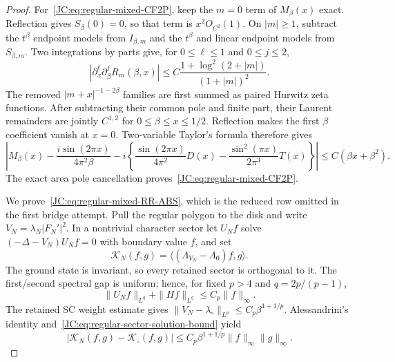 \begin{proof}
For~\eqref{JC:eq:regular-mixed-CF2P}, keep the $m=0$ term of
$M_\beta(x)$ exact.  Reflection gives $S_\beta(0)=0$, so that term is
$x^2O_{C^2}(1)$.  On $|m|\ge1$, subtract the $t^\beta$ endpoint models
from $I_{\beta,m}$ and the $t^\beta$ and linear endpoint models from
$S_{\beta,m}$.  Two integrations by parts give, for
$0\le\ell\le1$ and $0\le j\le2$,
\begin{equation}\label{JC:eq:regular-mixed-joint-remainder}
 |\partial_x^\ell\partial_\beta^jR_m(\beta,x)|
 \le C\frac{1+\log^2(2+|m|)}{(1+|m|)^2}.
\end{equation}
The removed $|m+x|^{-1-2\beta}$ families are first summed as paired
Hurwitz zeta functions.  After subtracting their common pole and finite
part, their Laurent remainders are jointly $C^{1,2}$ for
$0\le\beta\le x\le1/2$.  Reflection makes the first $\beta$ coefficient
vanish at $x=0$.  Two-variable Taylor's formula therefore gives
\[
 \left|M_\beta(x)-\frac{i\sin(2\pi x)}{4\pi^2\beta}
 -i\left\{\frac{\sin(2\pi x)}{4\pi^2}D(x)
 -\frac{\sin^2(\pi x)}{2\pi^3}T(x)\right\}\right|
 \le C(\beta x+\beta^2).
\]
The exact area pole cancellation proves~\eqref{JC:eq:regular-mixed-CF2P}.

We prove~\eqref{JC:eq:regular-mixed-RR-ABS}, which is the reduced row omitted
in the first bridge attempt.  Pull the regular polygon to the disk and
write $V_N=\lambda_N|F_N'|^2$.  In a nontrivial character sector let
$U_Nf$ solve $(-\Delta-V_N)U_Nf=0$ with boundary value $f$, and set
\[
 \mathcal K_N(f,g)=\langle(\Lambda_{V_N}-\Lambda_0)f,g\rangle.
\]
The ground state is invariant, so every retained sector is orthogonal to
it.  The first/second spectral gap is uniform; hence, for fixed $p>4$ and
$q=2p/(p-1)$,
\begin{equation}\label{JC:eq:regular-sector-solution-bound}
 \|U_Nf\|_{L^q}+\|Hf\|_{L^q}\le C_p\|f\|_\infty.
\end{equation}
The retained SC weight estimate gives
$\|V_N-\lambda_\circ\|_{L^p}\le C_p\beta^{1+1/p}$.
Alessandrini's identity and~\eqref{JC:eq:regular-sector-solution-bound} yield
\begin{equation}\label{JC:eq:regular-sector-potential-perturbation}
 |\mathcal K_N(f,g)-\mathcal K_\circ(f,g)|
 \le C_p\beta^{1+1/p}\|f\|_\infty\|g\|_\infty.
\end{equation}


\end{proof}
